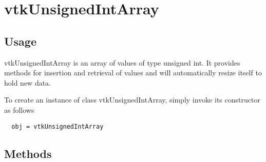 \section{vtkUnsignedIntArray}

\subsection{Usage}

 vtkUnsignedIntArray is an array of values of type unsigned int.  It
 provides methods for insertion and retrieval of values and will
 automatically resize itself to hold new data.

To create an instance of class vtkUnsignedIntArray, simply
invoke its constructor as follows
\begin{verbatim}
  obj = vtkUnsignedIntArray
\end{verbatim}
\subsection{Methods}

